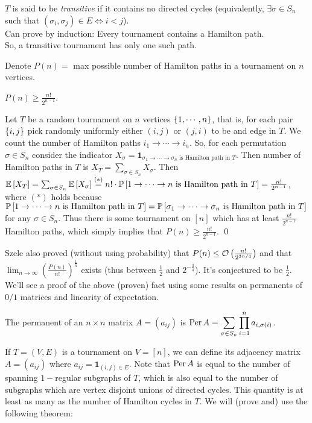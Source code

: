 $T$ is said to be \textit{transitive} if it contains no directed cycles (equivalently, $\exists \sigma\in S_n$ such that $(\sigma_i,\sigma_j)\in E\iff i<j$).\\
Can prove by induction: Every tournament contains a Hamilton path.\\
So, a transitive tournament has only one such path.

Denote $P(n) =$ max possible number of Hamilton paths in a tournament on $n$ vertices.

\begin{thm}[Szele] $P(n)\geq \frac{n!}{2^{n-1}}$.
\end{thm}
\begin{pf}
Let $T$ be a random tournament on $n$ vertices $\set{1,\cdots, n}$, that is, for each pair $\set{i,j}$ pick randomly uniformly either $(i,j)$ or $(j,i)$ to be and edge in $T$. We count the number of Hamilton paths $i_1\to \cdots \to i_n$. So, for each permutation $\sigma\in S_n$ consider the indicator $X_{\sigma} = \pmb 1_{\sigma_1\to\cdots\to \sigma_n \text{ is Hamilton path in }T}$. Then number of Hamilton paths in $T$ is $X_T=\sum_{\sigma\in S_n}X_{\sigma}$. Then $\E{X_T} = \sum_{\sigma\in S_n} \E{X_\sigma} \stackrel{(*)}{=} n!\cdot\P{1\to \cdots \to n\text{ is Hamilton path in }T} = \frac{n!}{2^{n-1}}$, where $(*)$ holds because $\P{1\to \cdots \to n\text{ is Hamilton path in }T} = \P{\sigma_1\to \cdots \to \sigma_n\text{ is Hamilton path in }T}$ for any $\sigma\in S_n$. Thus there is some tournament on $[n]$ which has at least $\frac{n!}{2^{n-1}}$ Hamilton paths, which simply implies that $P(n)\geq \frac{n!}{2^{n-1}}$.
\qed\end{pf}

Szele also proved (without using probability) that $P(n)\leq \cO\left(\frac{n!}{2^{3n/4}}\right)$ and that $\lim_{n\to\infty}\left(\frac{P(n)}{n!}\right)^{\frac{1}{n}}$ exists (thus between $\frac12$ and $2^{-\frac{3}{4}}$). It's conjectured to be $\frac{1}{2}$. \\
We'll see a proof of the above (proven) fact using some results on permanents of $0/1$ matrices and linearity of expectation.

\begin{defn}[Permanent]
The permanent of an $n\times n$ matrix $A=(a_{ij})$ is $\ds\per A = \sum_{\sigma\in S_n}\prod_{i=1}^n a_{i,\sigma(i)}$.
\end{defn}

If $T=(V,E)$ is a tournament on $V=[n]$, we can define its adjacency matrix $A=(a_{ij})$ where $a_{ij} = \pmb 1_{(i,j)\in E}$. Note that $\per A$ is equal to the number of spanning $1-$regular subgraphs of $T$, which is also equal to the number of subgraphs which are vertex disjoint unions of directed cycles. This quantity is at least as many as the number of Hamilton cycles in $T$. We will (prove and) use the following theorem:

